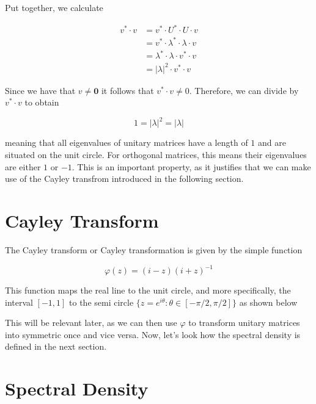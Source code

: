 Put together, we calculate

\begin{align*}
    v^* \cdot v & = v^* \cdot U^* \cdot U \cdot v \\
    & = v^* \cdot \lambda^* \cdot \lambda \cdot v \\
    & = \lambda^* \cdot \lambda\cdot v^* \cdot v \\
    & = \left| \lambda \right|^2 \cdot v^* \cdot v
\end{align*}

Since we have that $v \neq \mathbf{0}$ it follows that $v^* \cdot v \neq 0$.
Therefore, we can divide by $v^* \cdot v$ to obtain

\begin{equation} \label{eq:unitary_eigenvalues}
    1 = \left| \lambda \right|^2 = \left| \lambda \right|
\end{equation}

meaning that all eigenvalues of unitary matrices have a length of $1$ and are situated on the unit circle.
For orthogonal matrices, this means their eigenvalues are either $1$ or $-1$.
This is an important property, as it justifies that we can make use of the Cayley transfrom introduced in the following section.

\section{Cayley Transform}

The Cayley transform or Cayley transformation is given by the simple function

$$\varphi(z) = (i-z)(i+z)^{-1}$$

This function maps the real line to the unit circle, and more specifically, the interval $[-1, 1]$ to the semi circle
$\{z = e^{i\theta}: \theta \in [-\pi/2,\pi/2]\}$ as shown below

\vspace{0.5cm}



This will be relevant later, as we can then use $\varphi$ to transform unitary matrices into symmetric once and vice versa.
Now, let's look how the spectral density is defined in the next section.

\section{Spectral Density}